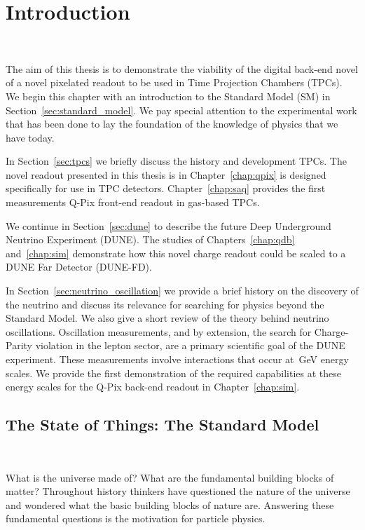 \chapter{Introduction}~\label{chap:intro}

The aim of this thesis is to demonstrate the viability of the digital back-end novel of a novel pixelated readout to be used in Time Projection Chambers (TPCs). 
We begin this chapter with an introduction to the Standard Model (SM) in Section~\ref{sec:standard_model}.
We pay special attention to the experimental work that has been done to lay the foundation of the knowledge of physics that we have today.

In Section~\ref{sec:tpcs} we briefly discuss the history and development TPCs. 
The novel readout presented in this thesis is in Chapter~\ref{chap:qpix} is designed specifically for use in TPC detectors.
Chapter~\ref{chap:saq} provides the first measurements Q-Pix front-end readout in gas-based TPCs.

We continue in Section~\ref{sec:dune} to describe the future Deep Underground Neutrino Experiment (DUNE).
The studies of Chapters~\ref{chap:qdb} and~\ref{chap:sim} demonstrate how this novel charge readout could be scaled to a DUNE Far Detector (DUNE-FD).

In Section~\ref{sec:neutrino_oscillation} we provide a brief history on the discovery of the neutrino and discuss its relevance for searching for physics beyond the Standard Model.
We also give a short review of the theory behind neutrino oscillations.
Oscillation measurements, and by extension, the search for Charge-Parity violation in the lepton sector, are a primary scientific goal of the DUNE experiment.
These measurements involve interactions that occur at~\unit{GeV} energy scales.
We provide the first demonstration of the required capabilities at these energy scales for the Q-Pix back-end readout in Chapter~\ref{chap:sim}.

\section{The State of Things: The Standard Model}~\label{sec:standard_model}

What is the universe made of?
What are the fundamental building blocks of matter?
Throughout history thinkers have questioned the nature of the universe and wondered what the basic building blocks of nature are.
Answering these fundamental questions is the motivation for particle physics.

